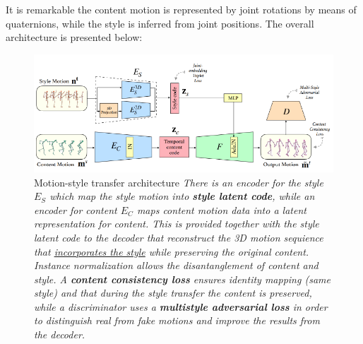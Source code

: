 It is remarkable the content motion is represented by joint rotations by means of quaternions, while the style is inferred from joint positions. The overall architecture is presented below:
\begin{figure}
    \centering
    \includegraphics[scale=1]{img/MotionStyle_arch.png}
    \caption{Motion-style transfer architecture \textit{There is an encoder for the style $E_S$ which map the style motion into \textbf{style latent code}, while an encoder for content $E_C$ maps content motion data into a latent representation for content. This is provided together with the style latent code to the decoder that reconstruct the 3D motion sequience that \underline{incorporates the style} while preserving the original content. Instance normalization allows the disantanglement of content and style. A \textbf{content consistency loss} ensures identity mapping (same style) and that during the style transfer the content is preserved, while a discriminator uses a  \textbf{multistyle adversarial loss} in order to distinguish real from fake motions and improve the results from the decoder.}}
\end{figure}